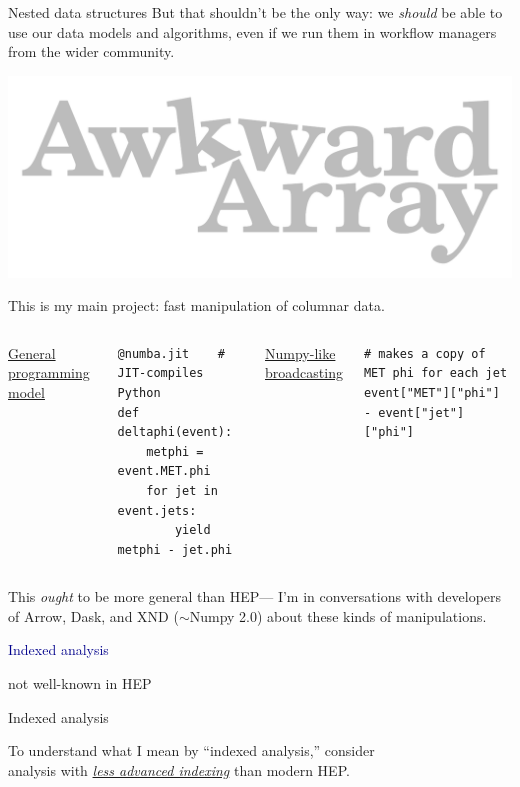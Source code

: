 \documentclass[aspectratio=169]{beamer}
\begin{document}
\begin{frame}[fragile]{Nested data structures}
\Large
\vspace{0.5 cm}
But that shouldn't be the only way: we {\it should} be able to use our data models and algorithms, even if we run them in workflow managers from the wider community.

\large
\vspace{0.5 cm}
\hfill \includegraphics[height=1 cm]{awkward-logo.pdf}

\vspace{-1 cm}
This is my main project: fast manipulation of columnar data.

\vspace{0.25 cm}
\scriptsize
\begin{columns}[t]
\underline{\large General programming model}

\begin{verbatim}
@numba.jit    # JIT-compiles Python
def deltaphi(event):
    metphi = event.MET.phi
    for jet in event.jets:
        yield metphi - jet.phi
\end{verbatim}

\underline{\large Numpy-like broadcasting}

\begin{verbatim}
# makes a copy of MET phi for each jet
event["MET"]["phi"] - event["jet"]["phi"]
\end{verbatim}
\end{columns}

\large
\vspace{0.5 cm}
This {\it ought} to be more general than HEP--- I'm in conversations with developers of Arrow, Dask, and XND ($\sim$Numpy 2.0) about these kinds of manipulations.
\end{frame}

\begin{frame}{}
\huge
\vspace{0.5 cm}
\begin{center}
\textcolor{darkblue}{Indexed analysis}

\large
\vspace{0.5 cm}
not well-known in HEP
\end{center}
\end{frame}

\begin{frame}{Indexed analysis}
\Large
\vspace{0.5 cm}
\begin{center}
To understand what I mean by ``indexed analysis,'' consider \\
analysis with \underline{\it less advanced indexing} than modern HEP.
\end{center}
\end{frame}
\end{document}
